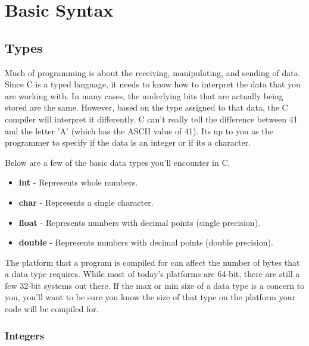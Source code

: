 \documentclass[../main.tex]{subfiles}
\begin{document}
	\chapter{Basic Syntax}
	
	
	\section{Types}
	
	Much of programming is about the receiving, manipulating, and sending of data.  Since C is a typed language, it needs to know how to interpret the data that you are working with.  In many cases, the underlying bits that are actually being stored are the same.  However, based on the type assigned to that data, the C compiler will interpret it differently.  C can't really tell the difference between 41 and the letter 'A' (which has the ASCII value of 41).  Its up to you as the programmer to specify if the data is an integer or if its a character.
	
	Below are a few of the basic data types you'll encounter in C.	
	\begin{itemize}
		\item \textbf{int}		-	Represents whole numbers.
		\item \textbf{char}		-	Represents a single character.
		\item \textbf{float}	-	Represents numbers with decimal points (single precision).
		\item \textbf{double} 	-	Represents numbers with decimal points (double precision).
	\end{itemize}

	The platform that a program is compiled for can affect the number of bytes that a data type requires.  While most of today's platforms are 64-bit, there are still a few 32-bit systems out there.  If the max or min size of a data type is a concern to you, you'll want to be sure you know the size of that type on the platform your code will be compiled for.
	\subsection{Integers}
	
\end{document}
